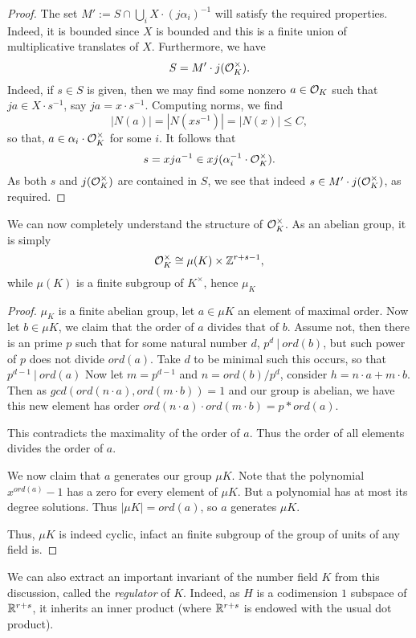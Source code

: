 \begin{proof}
  The set $M' := S \cap \bigcup_{i} X \cdot (j \alpha_{i})^{-1}$ will satisfy the required properties.
  Indeed, it is bounded since $X$ is bounded and this is a finite union of multiplicative translates of $X$.
  Furthermore, we have
  \[ S = M' \cdot j(\mathcal{O}_{K}^{\times}).\]
  Indeed, if $s \in S$ is given, then we may find some nonzero $a \in \mathcal{O}_{K}$ such that $j a \in X \cdot s^{-1}$, say $ja = x \cdot s^{-1}$.
  Computing norms, we find
  \[ |N(a)| = |N(xs^{-1})| = |N(x)| \le C, \]
  so that, $a \in \alpha_{i} \cdot \mathcal{O}_{K}^{\times}$ for some $i$.
  It follows that
  \[ s = x ja^{-1} \in x j(\alpha_{i}^{-1} \cdot \mathcal{O}_{K}^{\times}). \]
  As both $s$ and $j(\mathcal{O}_{K}^{\times})$ are contained in $S$, we see that indeed $s \in M' \cdot j(\mathcal{O}_{K}^{\times})$, as required.
\end{proof}

We can now completely understand the structure of $\mathcal{O}_{K}^{\times}$.
As an abelian group, it is simply
\[ \mathcal{O}_{K}^{\times} \cong \mu(K) \times \mathbb{Z}^{r + s - 1}, \]
while $\mu(K)$ is a finite subgroup of $K^{\times}$, hence $\mu_{K}$ 

\begin{proof}
  $\mu_{K}$ is a finite abelian group, let $a \in \mu{K}$ an element of maximal order.
  Now let $b \in \mu{K}$, we claim that the order of $a$ divides that of $b$.
  Assume not, then there is an prime $p$ such that for some natural number $d$, $p^d \ | \ ord(b)$, but such power of $p$ does not divide $ord(a)$.
  Take $d$ to be minimal such this occurs, so that $p^{d-1} \ | \ ord(a)$
  Now let $m = p^{d-1}$ and $n = ord(b)/p^d$, consider $h = n \cdot a + m \cdot b$.
  Then as $gcd(ord(n\cdot a), ord(m \cdot b)) = 1$ and our group is abelian, we have this new element has order $ord(n\cdot a) \cdot ord(m \cdot b) = p*ord(a)$.
  
  This contradicts the maximality of the order of $a$. Thus the order of all elements divides the order of $a$.

  We now claim that $a$ generates our group $\mu{K}$. Note that the polynomial $x^{ord(a)} - 1$ has a zero for every element of $\mu{K}$. 
  But a polynomial has at most its degree solutions. Thus $|\mu{K}| = ord(a)$, so $a$ generates $\mu{K}$.

  Thus, $\mu{K}$ is indeed cyclic, infact an finite subgroup of the group of units of any field is.
\end{proof}

We can also extract an important invariant of the number field $K$ from this discussion, called the \emph{regulator} of $K$.
Indeed, as $H$ is a codimension $1$ subspace of $\mathbb{R}^{r+s}$, it inherits an inner product (where $\mathbb{R}^{r+s}$ is endowed with the usual dot product).

